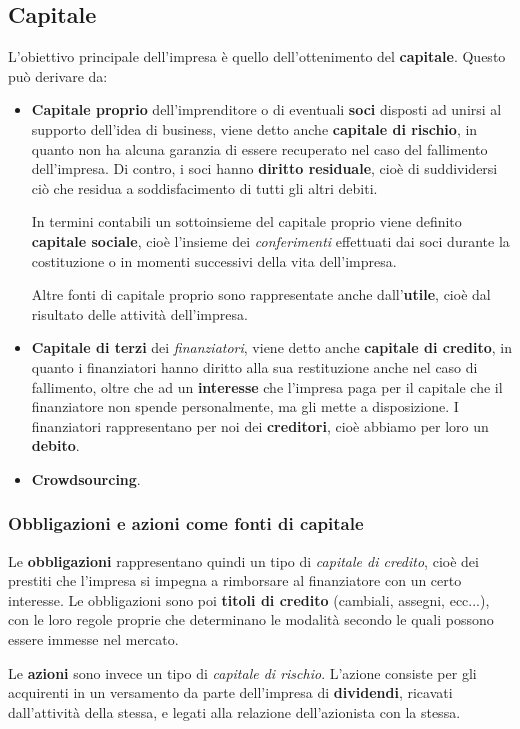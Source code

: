 \documentclass[a4paper,11pt]{article}
\begin{document}
\subsection{Capitale}
L'obiettivo principale dell'impresa è quello dell'ottenimento del \textbf{capitale}.
Questo può derivare da:
\begin{itemize}
	\item \textbf{Capitale proprio} dell'imprenditore o di eventuali \textbf{soci} disposti ad unirsi al supporto dell'idea di business, viene detto anche \textbf{capitale di rischio}, in quanto non ha alcuna garanzia di essere recuperato nel caso del fallimento dell'impresa. Di contro, i soci hanno \textbf{diritto residuale}, cioè di suddividersi ciò che residua a soddisfacimento di tutti gli altri debiti.

		In termini contabili un sottoinsieme del capitale proprio viene definito \textbf{capitale sociale}, cioè l'insieme dei \textit{conferimenti} effettuati dai soci durante la costituzione o in momenti successivi della vita dell'impresa.

		Altre fonti di capitale proprio sono rappresentate anche dall'\textbf{utile}, cioè dal risultato delle attività dell'impresa.
	\item \textbf{Capitale di terzi} dei \textit{finanziatori}, viene detto anche \textbf{capitale di credito}, in quanto i finanziatori hanno diritto alla sua restituzione anche nel caso di fallimento, oltre che ad un \textbf{interesse} che l'impresa paga per il capitale che il finanziatore non spende personalmente, ma gli mette a disposizione.
		I finanziatori rappresentano per noi dei \textbf{creditori}, cioè abbiamo per loro un \textbf{debito}.
	\item \textbf{Crowdsourcing}.
\end{itemize}

\subsubsection{Obbligazioni e azioni come fonti di capitale}

Le \textbf{obbligazioni} rappresentano quindi un tipo di \textit{capitale di credito}, cioè dei prestiti che l'impresa si impegna a rimborsare al finanziatore con un certo interesse.
Le obbligazioni sono poi \textbf{titoli di credito} (cambiali, assegni, ecc...), con le loro regole proprie che determinano le modalità secondo le quali possono essere immesse nel mercato.

Le \textbf{azioni} sono invece un tipo di \textit{capitale di rischio}.
L'azione consiste per gli acquirenti in un versamento da parte dell'impresa di \textbf{dividendi}, ricavati dall'attività della stessa, e legati alla relazione dell'azionista con la stessa.
\end{document}
